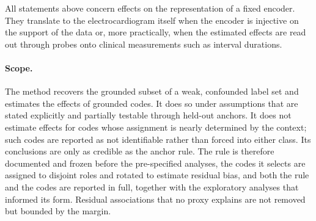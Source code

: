 All statements above concern effects on the representation of a fixed encoder. They translate to the electrocardiogram itself when the encoder is injective on the support of the data or, more practically, when the estimated effects are read out through probes onto clinical measurements such as interval durations.

\paragraph{Scope.}
The method recovers the grounded subset of a weak, confounded label set and estimates the effects of grounded codes. It does so under assumptions that are stated explicitly and partially testable through held-out anchors. It does not estimate effects for codes whose assignment is nearly determined by the context; such codes are reported as not identifiable rather than forced into either class. Its conclusions are only as credible as the anchor rule. The rule is therefore documented and frozen before the pre-specified analyses, the codes it selects are assigned to disjoint roles and rotated to estimate residual bias, and both the rule and the codes are reported in full, together with the exploratory analyses that informed its form. Residual associations that no proxy explains are not removed but bounded by the margin.
